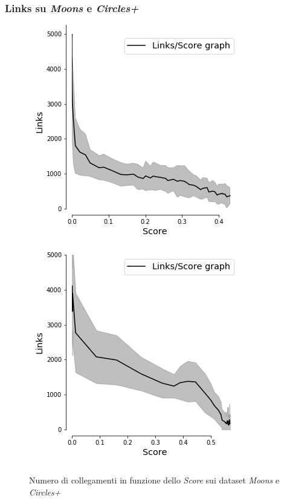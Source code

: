 \documentclass{beamer}
\begin{document}
\begin{frame}
 \frametitle{Links su \textit{Moons} e \textit{Circles+}}
 \begin{figure}
  \includegraphics[scale = 0.42]{images/Links_Score_moons.png}
  \includegraphics[scale = 0.42]{images/Links_Score_circles+.png}
  \caption{\large Numero di collegamenti in funzione dello \textit{Score} sui dataset \textit{Moons} e \textit{Circles+}}
 \end{figure}

\end{frame}
\end{document}
